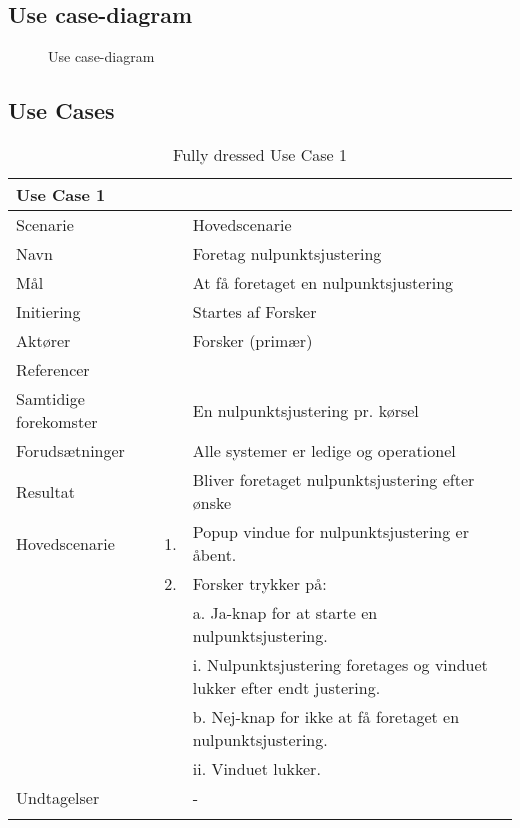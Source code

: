 \subsection{Use case-diagram}

\begin{figure}[H]
	\centering
	\caption{Use case-diagram}
	\label{fig:Use Cases}
\end{figure}



\subsection{Use Cases}

\begin{longtabu} to  %
	{\large \textbf{Use Case 1}} && \\
	\toprule
	Scenarie && Hovedscenarie\\
	Navn && Foretag nulpunktsjustering\\
	Mål && At få foretaget en nulpunktsjustering\\
	Initiering && Startes af Forsker\\
	Aktører && Forsker (primær)\\
	Referencer && \\
	Samtidige forekomster  && En nulpunktsjustering pr. kørsel \\
	Forudsætninger && Alle systemer er ledige og operationel\\ 
	Resultat && Bliver foretaget nulpunktsjustering efter ønske\\ \midrule
	Hovedscenarie &    1. &		Popup vindue for nulpunktsjustering er åbent.\\				 	
	&    2. & Forsker trykker på:\\ 
	& &	a. Ja-knap for at starte en nulpunktsjustering.\\[-1ex]
	& &		 i. Nulpunktsjustering foretages og vinduet lukker efter endt justering.\\[-1ex]
	& &  b. Nej-knap for ikke at få foretaget en nulpunktsjustering.\\[-1ex]
	& &   ii. Vinduet lukker.\\[-1ex]	
	Undtagelser && -  \\ \bottomrule
	
	\caption{Fully dressed Use Case 1}
	\label{UC1}
\end{longtabu}

